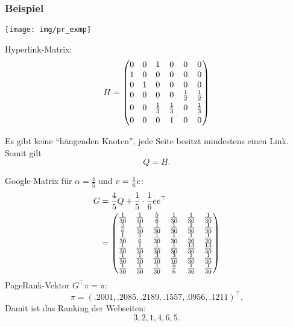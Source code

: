 \subsubsection*{Beispiel}
\begin{center}
  \begin{minipage}{8cm}
    \texttt{[image: img/pr\_exmp]}
  \end{minipage}
  \begin{minipage}{5cm}
    Hyperlink-Matrix:
    \[ H = \begin{pmatrix}
        0 & 0 & 1 & 0 & 0 & 0 \\
        1 & 0 & 0 & 0 & 0 & 0 \\
        0 & 1 & 0 & 0 & 0 & 0 \\
        0 & 0 & 0 & 0 & \frac{1}{2} & \frac{1}{2} \\[.3em]
        0 & 0 & \frac{1}{3} & \frac{1}{3} & 0 & \frac{1}{3} \\[.3em]
        0 & 0 & 0 & 1 & 0 & 0
      \end{pmatrix}
    \]
  \end{minipage}
\end{center}
Es gibt keine ``hängenden Knoten'', jede Seite besitzt mindestens einen Link.
Somit gilt
\[ Q = H. \]

Google-Matrix für $\alpha = \frac{4}{5}$ und $v = \frac{1}{6} e$:
\begingroup
\renewcommand*{\arraystretch}{1.5}
\begin{align*}
  G &= \frac{4}{5} Q + \frac{1}{5} \cdot \frac{1}{6} e e^\top \\
    &= \begin{pmatrix}
      \frac{1}{30} & \frac{1}{30} & \frac{5}{6} & \frac{1}{30} & \frac{1}{30} & \frac{1}{30} \\
      \frac{5}{6} & \frac{1}{30} & \frac{1}{30} & \frac{1}{30} & \frac{1}{30} & \frac{1}{30} \\
      \frac{1}{30} & \frac{5}{6} & \frac{1}{30} & \frac{1}{30} & \frac{1}{30} & \frac{1}{30} \\
      \frac{1}{30} & \frac{1}{30} & \frac{1}{30} & \frac{1}{30} & \frac{13}{30} & \frac{13}{30} \\
      \frac{1}{30} & \frac{1}{30} & \frac{3}{10} & \frac{3}{10} & \frac{1}{30} & \frac{1}{30} \\
      \frac{1}{30} & \frac{1}{30} & \frac{1}{30} & \frac{5}{6} & \frac{1}{30} & \frac{1}{30}
    \end{pmatrix}
\end{align*}
\endgroup
PageRank-Vektor $G^\top \pi = \pi$:
\[ \pi = (\num{.2001}, \num{.2085}, \num{.2189},
  \num{.1557}, \num{.0956}, \num{.1211} )^\top. \]
Damit ist das Ranking der Webseiten:
\[ 3, 2, 1, 4, 6, 5. \]

